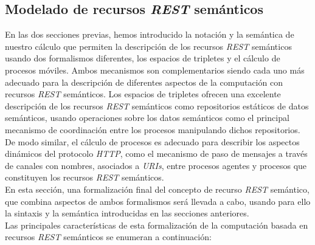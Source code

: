 \subsection{Modelado de recursos \textit{REST} sem\'anticos}

En las dos secciones previas, hemos introducido la notaci\'on y la sem\'antica de nuestro c\'alculo que permiten la descripci\'on de los recursos \textit{REST} sem\'anticos usando dos formalismos diferentes, los espacios de tripletes y el c\'alculo de procesos m\'oviles. Ambos mecanismos son complementarios siendo cada uno m\'as adecuado para la descripci\'on de diferentes aspectos de la computaci\'on con recursos \textit{REST} sem\'anticos. Los espacios de tripletes ofrecen una excelente descripci\'on de los recursos \textit{REST} sem\'anticos como repositorios est\'aticos de datos sem\'anticos, usando operaciones sobre los datos sem\'anticos como el principal mecanismo de coordinaci\'on entre los procesos manipulando dichos repositorios. De modo similar, el c\'alculo de procesos es adecuado para describir los aspectos din\'amicos del  protocolo \textit{HTTP}, como el mecanismo de paso de mensajes a trav\'es de canales con nombres, asociados a \textit{URIs}, entre procesos agentes y procesos que constituyen los recursos \textit{REST} sem\'anticos.\\
En esta secci\'on, una formalizaci\'on final del concepto de recurso \textit{REST} sem\'antico, que combina aspectos de ambos formalismos ser\'a llevada a cabo, usando para ello la sintaxis y la sem\'antica introducidas en las secciones anteriores.\\

Las principales caracter\'isticas de esta formalizaci\'on de la computaci\'on basada en recursos \textit{REST} sem\'anticos se enumeran a continuaci\'on:\\

